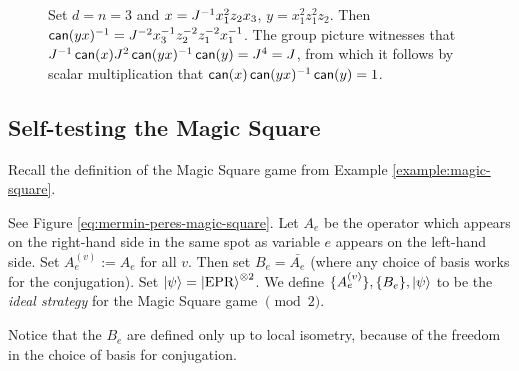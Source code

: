 \begin{figure}
{\begin{tabular}{
		m{}m{}m{}m{}m{}
		}
		\end{tabular}
	}
	\caption{Set $d = n = 3$ and $x = J^{-1}x_1^2z_2x_3$, $y = x_1^2z_1^2z_2$. Then $\operatorname*{\mathsf{can}}(yx)^{-1} = J^{-2}x_3^{-1}z_2^{-2}z_1^{-2}x_1^{-1}$. The group picture witnesses that $J^{-1}\operatorname*{\mathsf{can}}(x) J^2\operatorname*{\mathsf{can}}(yx)^{-1} \operatorname*{\mathsf{can}}(y) = J^4 = J$, from which it follows by scalar multiplication that $\operatorname*{\mathsf{can}}(x)\operatorname*{\mathsf{can}}(yx)^{-1}\operatorname*{\mathsf{can}}(y) = 1$.}
	\label{fig:small-group-pictures-pauli-n}
\end{figure}


\subsection{Self-testing the Magic Square}
Recall the definition of the Magic Square game from Example \ref{example:magic-square}. 

\begin{definition} 
	See Figure \ref{eq:mermin-peres-magic-square}. Let $A_e$ be the operator which appears on the right-hand side in the same spot as variable $e$ appears on the left-hand side. Set $A_e^{(v)}:= A_e$ for all $v$. Then set $B_e = \bar{A_e}$ (where any choice of basis works for the conjugation).  Set $\ket\psi = \ket{\text{EPR}}^{\otimes 2}$. We define $\{A_e^{(v)}\}, \{B_e \}, \ket\psi$ to be the \emph{ideal strategy} for the Magic Square game $\pmod 2$.
\end{definition}
Notice that the $B_e$ are defined only up to local isometry, because of the freedom in the choice of basis for conjugation.


